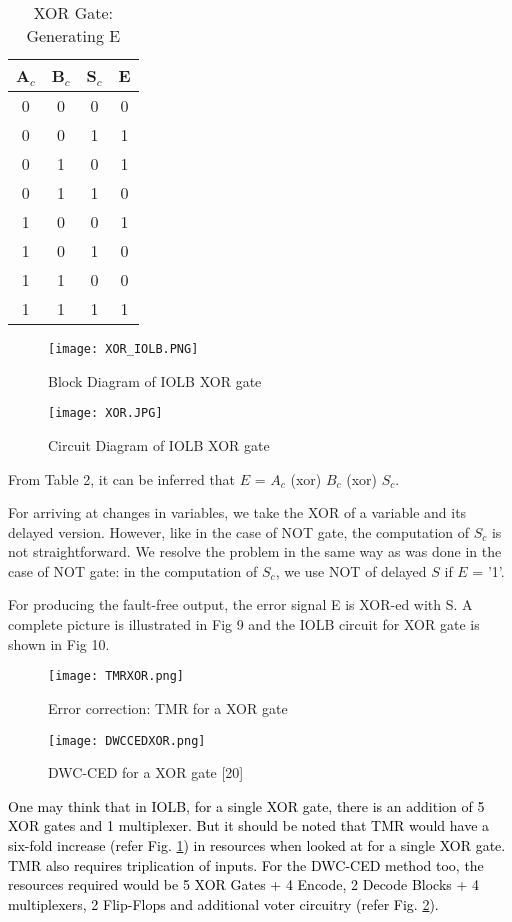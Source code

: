 \documentclass[10pt,journal,cspaper,compsoc]{IEEEtran}
\begin{document}
\begin{table}[t]
\caption{XOR Gate: Generating E} \centering \begin{tabular}{|c| c| c| c|} \hline
A$_{c}$ & B$_{c}$ & S$_{c}$ & E  \\ [0.5ex] \hline 0 & 0 & 0 & 0 \\ 0 & 0 & 1 & 1\\
0 & 1 & 0 & 1 \\
0 & 1 & 1 & 0 \\
1 & 0 & 0 & 1\\
1 & 0 & 1 & 0 \\
1 & 1 & 0 & 0\\
1 & 1 & 1 & 1\\[1ex] \hline \end{tabular}
\label{table:nonlin} \end{table}
\begin{figure}[t]
  \caption{Block Diagram of IOLB XOR gate }
  \centering
       \texttt{[image: XOR\_IOLB.PNG]}
\end{figure}

\begin{figure}[t]
  \caption{Circuit Diagram of IOLB XOR gate }
\texttt{[image: XOR.JPG]}
\end{figure}
From Table 2, it can be inferred that $E$ = $A_c$ (xor) $B_c$ (xor) $S_c$.

For arriving at changes in variables, we take the XOR of a variable and its delayed version. However, like in the case of NOT gate, the computation of $S_c$ is not straightforward. We resolve the problem in the same way as was done in the case of NOT gate: in the computation of $S_c$, we use NOT of delayed $S$ if $E$ = '1'.

For producing the fault-free output, the error signal E is XOR-ed with S. A complete picture is illustrated in Fig 9 and the IOLB circuit for XOR gate is shown in Fig 10.

\begin{figure}[t]
  \caption{Error correction: TMR for a XOR gate}\label{fig_tmr_xor}
  \centering
       \texttt{[image: TMRXOR.png]}
\end{figure}

\begin{figure}[t]
  \caption{DWC-CED for a XOR gate [20]}\label{fig_dwc_xor}
\texttt{[image: DWCCEDXOR.png]}
\end{figure}

\textcolor{black} {One may think that in IOLB, for a single XOR gate, there is an addition of 5 XOR gates and 1 multiplexer. But it should be noted that TMR would have a six-fold increase (refer Fig. \ref{fig_tmr_xor}) in resources when looked at for a single XOR gate. TMR also requires triplication of inputs. For the DWC-CED method too, the resources required would be 5 XOR Gates + 4 Encode, 2 Decode Blocks + 4 multiplexers, 2 Flip-Flops and additional voter circuitry (refer Fig. \ref{fig_dwc_xor}).}
\end{document}
